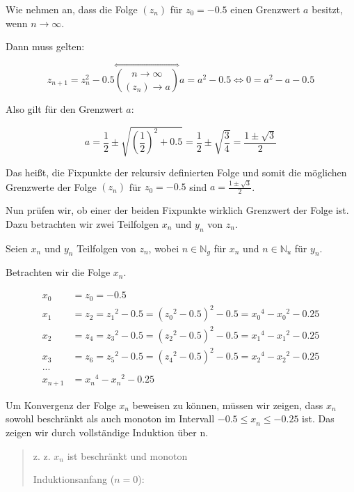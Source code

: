 \documentclass[a4paper, 12pt]{book}
\begin{document}
Wie nehmen an, dass die Folge \(\left( z_{n} \right)\) für
\(z_{0} =  - 0.5\) einen Grenzwert \(a\) besitzt, wenn
\(n \rightarrow \infty\).

Dann muss gelten:

\[z_{n + 1} = z_{n}^{2} - 0.5\overset{\Leftrightarrow}{\binom{n \rightarrow \infty}{\left( z_{n} \right) \rightarrow a}}a = a^{2} - 0.5 \Longleftrightarrow 0 = a^{2} - a - 0.5\]

Also gilt für den Grenzwert \(a\):

\[a = \frac{1}{2} \pm \sqrt{\left( \frac{1}{2} \right)^{2} + 0.5} = \frac{1}{2} \pm \sqrt{\frac{3}{4}} = \frac{1 \pm \sqrt{3}}{2}\]

Das heißt, die Fixpunkte der rekursiv definierten Folge und somit die
möglichen Grenzwerte der Folge \(\left( z_{n} \right)\) für
\(z_{0} =  - 0.5\) sind \(a = \frac{1 \pm \sqrt{3}}{2}\).

Nun prüfen wir, ob einer der beiden Fixpunkte wirklich Grenzwert der
Folge ist. Dazu betrachten wir zwei Teilfolgen \(x_{n}\) und \(y_{n}\)
von \(z_{n}\).

Seien \(x_{n}\) und \(y_{n}\) Teilfolgen von \(z_{n}\), wobei
\(n \in \mathbb{N}_{g}\) für \(x_{n}\) und
\(n \in \mathbb{N}_{u}\) für \(y_{n}\).

Betrachten wir die Folge \(x_{n}\).

\begin{align*}
x_{0} &= z_{0} =  - 0.5\\
x_{1} &= z_{2} = {z_{1}}^{2} - 0.5 = ({z_{0}}^{2} - 0.5)^{2} - 0.5 = {x_{0}}^{4} - {x_{0}}^{2} - 0.25\\
x_{2} &= z_{4} = {z_{3}}^{2} - 0.5 = ({z_{2}}^{2} - 0.5)^{2} - 0.5 = {x_{1}}^{4} - {x_{1}}^{2} - 0.25\\
x_{3} &= z_{6} = {z_{5}}^{2} - 0.5 = ({z_{4}}^{2} - 0.5)^{2} - 0.5 = {x_{2}}^{4} - {x_{2}}^{2} - 0.25\\
... &\\
x_{n + 1} &= {x_{n}}^{4} - {x_{n}}^{2} - 0.25
\end{align*}

Um Konvergenz der Folge \(x_{n}\) beweisen zu können, müssen wir zeigen,
dass \(x_{n}\) sowohl beschränkt als auch monoton im Intervall
\(- 0.5{\leq x}_{n} \leq  - 0.25\) ist. Das zeigen wir durch
vollständige Induktion über n.

\begin{quote}
z. z. \(x_{n}\) ist beschränkt und monoton

Induktionsanfang (\(n = 0\)):
\end{quote}
\end{document}

